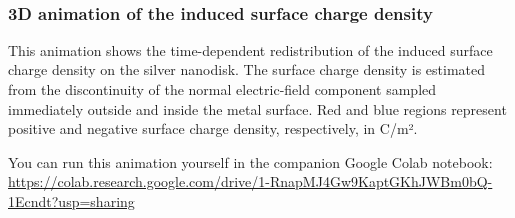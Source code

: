\documentclass[11pt]{article}
\begin{document}
    \begin{center}
    \end{center}
    { \hspace*{\fill} \\}
    
    \subsubsection{3D animation of the induced surface charge
density}\label{3d-animation-of-the-induced-surface-charge-density}

This animation shows the time-dependent redistribution of the induced
surface charge density on the silver nanodisk. The surface charge
density is estimated from the discontinuity of the normal
electric-field component sampled immediately outside and inside the
metal surface. Red and blue regions represent positive and negative
surface charge density, respectively, in C/m².

You can run this animation yourself in the companion Google Colab
notebook:
{\small\url{https://colab.research.google.com/drive/1-RnapMJ4Gw9KaptGKhJWBm0bQ-1Ecndt?usp=sharing}}


\end{document}
